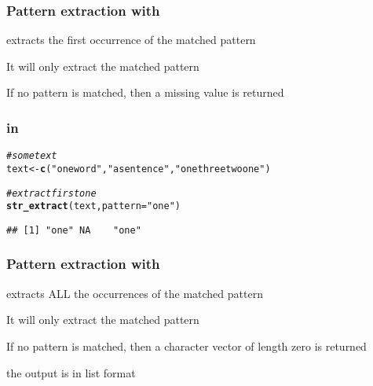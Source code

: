 \documentclass[12pt]{beamer}\usepackage[]{graphicx}\usepackage[]{color}
\makeatletter
\newcommand{\hlstr}[1]{\textcolor[rgb]{0.192,0.494,0.8}{#1}}%
\newcommand{\hlcom}[1]{\textcolor[rgb]{0.678,0.584,0.686}{\textit{#1}}}%
\newcommand{\hlstd}[1]{\textcolor[rgb]{0.345,0.345,0.345}{#1}}%
\newcommand{\hlkwb}[1]{\textcolor[rgb]{0.69,0.353,0.396}{#1}}%
\newcommand{\hlkwc}[1]{\textcolor[rgb]{0.333,0.667,0.333}{#1}}%
\newcommand{\hlkwd}[1]{\textcolor[rgb]{0.737,0.353,0.396}{\textbf{#1}}}%
\newenvironment{kframe}{%
 \def\at@end@of@kframe{}%
 \ifinner\ifhmode%
  \def\at@end@of@kframe{\end{minipage}}%
  \begin{minipage}{\columnwidth}%
 \fi\fi%
 \def\FrameCommand##1{\hskip\@totalleftmargin \hskip-\fboxsep
 \colorbox{shadecolor}{##1}\hskip-\fboxsep
     \hskip-\linewidth \hskip-\@totalleftmargin \hskip\columnwidth}%
 \MakeFramed {\advance\hsize-\width
   \@totalleftmargin\z@ \linewidth\hsize
   \@setminipage}}%
 {\par\unskip\endMakeFramed%
 \at@end@of@kframe}
\newenvironment{knitrout}{}{} %
\makeatother
\begin{document}

\begin{frame}[fragile]
\frametitle{Pattern extraction with }

\bbi
  \item {\hilit {}} extracts the first occurrence of the matched pattern
  \item It will only extract the matched pattern
  \item If no pattern is matched, then a missing value is returned
\ei

\end{frame}


\begin{frame}[fragile]
\frametitle{ in }

\begin{knitrout}\footnotesize
{}\color{fgcolor}\begin{kframe}
\begin{alltt}
\hlcom{# some text}
\hlstd{text} \hlkwb{<-} \hlkwd{c}\hlstd{(}\hlstr{"one word"}\hlstd{,} \hlstr{"a sentence"}\hlstd{,} \hlstr{"one three two one"}\hlstd{)}

\hlcom{# extract first one}
\hlkwd{str_extract}\hlstd{(text,} \hlkwc{pattern} \hlstd{=} \hlstr{"one"}\hlstd{)}
\end{alltt}
\begin{verbatim}
## [1] "one" NA    "one"
\end{verbatim}
\end{kframe}
\end{knitrout}

\end{frame}


\begin{frame}[fragile]
\frametitle{Pattern extraction with }

\bbi
  \item {\hilit {}} extracts ALL the occurrences of the matched pattern
  \item It will only extract the matched pattern
  \item If no pattern is matched, then a character vector of length zero is returned
  \item the output is in list format
\ei

\end{frame}
\end{document}
